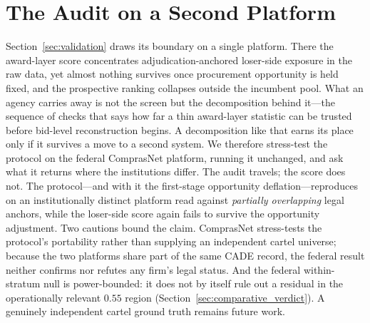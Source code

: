 
\section{The Audit on a Second Platform}
\label{sec:comparative}

Section~\ref{sec:validation} draws its boundary on a single platform.
There the award-layer score concentrates adjudication-anchored
loser-side exposure in the raw data, yet almost nothing survives once
procurement opportunity is held fixed, and the prospective ranking
collapses outside the incumbent pool. What an agency carries away is
not the screen but the decomposition behind it---the sequence of checks
that says how far a thin award-layer statistic can be trusted before
bid-level reconstruction begins. A decomposition like that earns its
place only if it survives a move to a second system. We therefore
stress-test the protocol on the federal ComprasNet platform, running it
unchanged, and ask what it returns where the institutions differ. The
audit travels; the score does not. The protocol---and with it the
first-stage opportunity deflation---reproduces on an institutionally
distinct platform read against \emph{partially overlapping} legal
anchors, while the loser-side score again fails to survive the
opportunity adjustment. Two cautions bound the claim. ComprasNet
stress-tests the protocol's portability rather than supplying an
independent cartel universe; because the two platforms share part of
the same CADE record, the federal result neither confirms nor refutes
any firm's legal status. And the federal within-stratum null is
power-bounded: it does not by itself rule out a residual in the
operationally relevant $0.55$ region
(Section~\ref{sec:comparative_verdict}). A genuinely independent cartel
ground truth remains future work.

